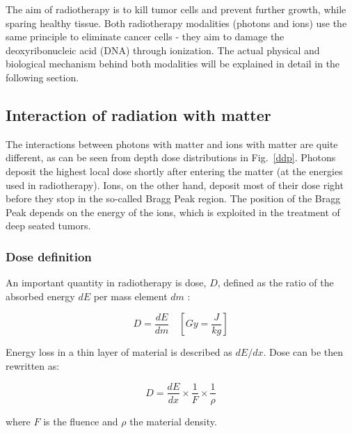 \documentclass[type=dr, dr=rernat, accentcolor=tud7b,colorbacktitle, bigchapter, openright, twoside, 12pt ]{tudthesis}
\begin{document}
The aim of radiotherapy is to kill tumor cells and prevent further growth, while sparing healthy tissue. Both radiotherapy modalities (photons and ions) use the same principle to eliminate cancer cells - 
they aim to damage the deoxyribonucleic acid (DNA) through ionization. The actual physical and biological mechanism behind both modalities will be explained in detail in the following section.

\subsection{Interaction of radiation with matter}

The interactions between photons with matter and ions with matter are quite different, as can be seen from depth dose distributions in Fig.~\ref{ddp}. Photons deposit the highest local dose shortly after entering the matter 
(at the energies used in radiotherapy). Ions, on the other hand, deposit most of their dose right before they stop in the so-called Bragg Peak region. The position of the Bragg Peak depends on the energy of the ions, which is exploited in the treatment
of deep seated tumors.

\subsubsection{Dose definition}

An important quantity in radiotherapy is dose, $D$, defined as the ratio of the absorbed energy $dE$ per mass element $dm$ \cite{ICRU1993}:

\begin{equation}
 D = \frac{dE}{dm} \quad \left[ Gy = \frac{J}{kg} \right]
\end{equation}

Energy loss in a thin layer of material is described as $dE/dx$. Dose can be then rewritten as:

\begin{equation}
 D = \frac{dE}{dx} \times \frac{1}{F} \times \frac{1}{\rho}
\end{equation}

where $F$ is the fluence and $\rho$ the material density.


\newpage
\end{document}
